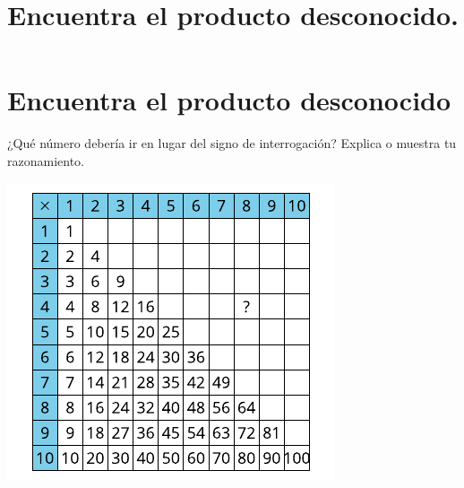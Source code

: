 \documentclass[,]{article}
\title{Encuentra el producto desconocido.}
\date{}
\begin{document}
\section*{Encuentra el producto desconocido}
¿Qué número debería ir en lugar del signo de interrogación? Explica o muestra tu razonamiento.%
\begin{image}{0}{1}{0}{}%
\includegraphics[max width=\linewidth,center]{../svg-source/tikz-file-153040.pdf}
\end{image}%
\end{document}
